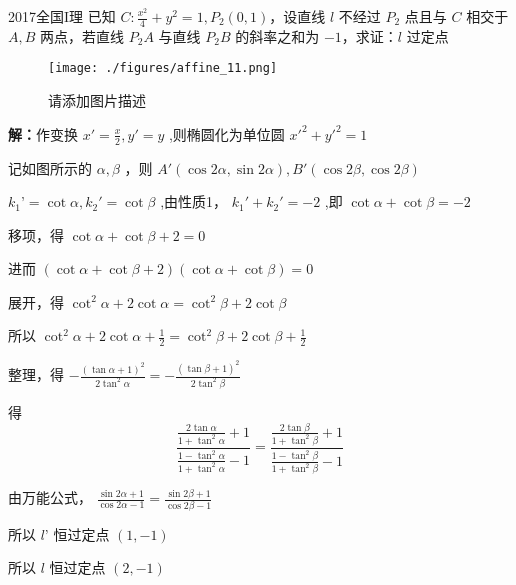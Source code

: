 \begin{example}{2017全国I理}
已知 $\displaystyle{C:\frac{x^2}4+y^2=1,P_2(0,1)}$，设直线 $\displaystyle{l}$ 不经过 $\displaystyle{P_2}$ 点且与 $\displaystyle{C}$ 相交于 $\displaystyle{A,B}$ 两点，若直线 $\displaystyle{P_2A}$ 与直线 $\displaystyle{P_2B}$ 的斜率之和为 $\displaystyle{-1}$，求证：$\displaystyle{l}$ 过定点
\begin{figure}[ht]
\centering
\texttt{[image: ./figures/affine\_11.png]}
\caption{请添加图片描述} \label{affine_fig11}
\end{figure}
\textbf{解：}作变换 $\displaystyle{x'=\frac{x}{2},y'=y}$ ,则椭圆化为单位圆 $\displaystyle{x'^2+y'^2=1}$

记如图所示的 $\displaystyle{\alpha,\beta}$ ，则 $\displaystyle{A'(\cos2\alpha,\sin2\alpha),B'(\cos2\beta,\cos2\beta)}$

$\displaystyle{k_1’=\cot{\alpha},k_2'=\cot{\beta}}$ ,由性质1， $\displaystyle{k_1'+k_2'=-2}$ ,即 $\displaystyle{\cot{\alpha}+\cot{\beta}=-2}$

移项，得 $\displaystyle{\cot\alpha+\cot \beta+2=0}$

进而 $\displaystyle{(\cot\alpha+\cot \beta+2)(\cot \alpha+\cot\beta)=0}$

展开，得 $\displaystyle{\cot^2\alpha+2\cot\alpha=\cot^2\beta+2\cot\beta}$

所以 $\displaystyle{\cot^2\alpha+2\cot\alpha+\frac{1}{2}=\cot^2\beta+2\cot\beta+\frac{1}{2}}$

整理，得 $\displaystyle{-\frac{(\tan\alpha+1)^2}{2\tan^2\alpha}=-\frac{(\tan\beta+1)^2}{2\tan^2\beta}}$

得 
$$\frac{\frac{2\tan\alpha}{1+\tan^2\alpha}+1}{\frac{1-\tan^2\alpha}{1+\tan^2\alpha}-1}=\frac{\frac{2\tan\beta}{1+\tan^2\beta}+1}{\frac{1-\tan^2\beta}{1+\tan^2\beta}-1}$$

由万能公式， $\displaystyle{\frac{\sin2\alpha+1}{\cos2\alpha-1}=\frac{\sin2\beta+1}{\cos2\beta-1}}$

所以 $\displaystyle{l’}$ 恒过定点 $\displaystyle{(1,-1)}$

所以 $\displaystyle{l}$ 恒过定点 $\displaystyle{(2,-1)}$ 
\end{example}
